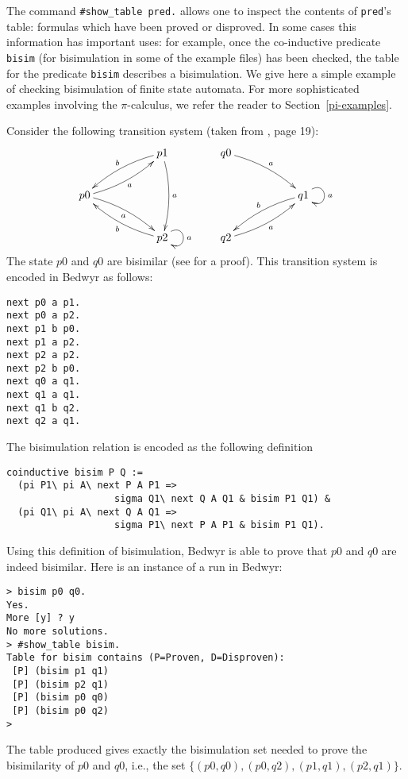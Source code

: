 \documentclass{article}
\begin{document}
The command \verb/#show_table pred./ allows one to inspect the
contents of \verb.pred.'s table: formulas which have been proved or
disproved.  In some cases this information has important uses: for
example, once the co-inductive predicate {\tt bisim} (for bisimulation
in some of the example files) has been checked, the table for the
predicate {\tt bisim} describes a bisimulation.  
We give here a simple example of checking bisimulation of finite
state automata. For more sophisticated examples involving the $\pi$-calculus,
we refer the reader to Section~\ref{pi-examples}.

Consider the following transition system (taken from \cite{milner99book}, 
page 19):
$$
\xymatrix{
   &  & p1 \ar@/_/[lld]_b \ar@/^/[dd]^a \\
p0 \ar@/_/[rru]_a \ar@/^/[rrd]_a \\
 & & p2 \ar@(ur,dr)^a \ar@/^/[llu]^b
}
\qquad
\xymatrix{
q0 \ar@/^/[rrd]^a \\
 & & q1 \ar@(ur,dr)^a \ar@/_/[dll]_b \\
q2 \ar@/_/[rru]_a
}
$$
The state $p0$ and $q0$ are bisimilar (see \cite{milner99book} for a proof).
This transition system is encoded in Bedwyr as follows:
\begin{verbatim}
next p0 a p1.
next p0 a p2.
next p1 b p0.
next p1 a p2.
next p2 a p2.
next p2 b p0.
next q0 a q1.
next q1 a q1.
next q1 b q2.
next q2 a q1.
\end{verbatim}
The bisimulation relation is encoded as the following definition
\begin{verbatim}
coinductive bisim P Q := 
  (pi P1\ pi A\ next P A P1 => 
                   sigma Q1\ next Q A Q1 & bisim P1 Q1) &
  (pi Q1\ pi A\ next Q A Q1 => 
                   sigma P1\ next P A P1 & bisim P1 Q1).
\end{verbatim}
Using this definition of bisimulation, Bedwyr is able to prove that
$p0$ and $q0$ are indeed bisimilar. Here is an instance of a run in Bedwyr:
\begin{verbatim}
> bisim p0 q0.
Yes.
More [y] ? y
No more solutions.
> #show_table bisim.
Table for bisim contains (P=Proven, D=Disproven):
 [P] (bisim p1 q1)
 [P] (bisim p2 q1)
 [P] (bisim p0 q0)
 [P] (bisim p0 q2)
> 
\end{verbatim}
The table produced gives exactly the bisimulation set
needed to prove the bisimilarity of $p0$ and $q0$, i.e.,
the set $\{(p0,q0), (p0, q2), (p1,q1), (p2,q1) \}.$

\end{document}
